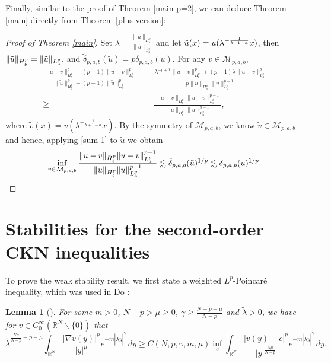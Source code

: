 \documentclass[11pt]{article}
\newtheorem{lemma}[theorem]{Lemma}
\newcommand{\R}{\mathbb{R}}
\numberwithin{equation}{section}
\begin{document}
Finally, similar to the proof of Theorem \ref{main p=2}, we can deduce Theorem \ref{main} directly from Theorem \ref{plus version}:
\begin{proof}[Proof of Theorem \ref{main}]
    Set $\lambda = \frac{\|u\|_{H^p_b}}{\|u\|_{L^p_a}}$ and let $\Tilde{u}(x) = u(\lambda^{-\frac{1}{b+1-a}} x)$, then $\|\Tilde{u}\|_{H^p_b} = \|\tilde{u}\|_{L^p_a}$, and $\tilde{\delta}_{p,a,b}(\tilde{u}) = p\delta_{p,a,b}(u)$. For any $v\in \mathcal{M}_{p,a,b}$,
    \begin{align*}
        \frac{\|\tilde{u}-v\|_{H_b^p}^p + (p-1)\|\tilde{u}-v\|_{L^p_a}^p}{\|\tilde{u}\|_{H^p_b}^p + (p-1)\|\tilde{u}\|_{L^p_a}^p} ={}& \frac{\lambda^{-p+1}\|u-\tilde{v}\|_{H^p_b}^p + (p-1)\lambda \|u-\tilde{v}\|_{L^p_a}^p}{p\|\tilde{u}\|_{H^p_b}\|\tilde{u}\|_{L^p_a}^{p-1}} \\
        \ge{}& \frac{\|u-\tilde{v}\|_{H^p_b}\|u-\tilde{v}\|_{L^p_a}^{p-1}}{\|u\|_{H_b^p}\|u\|_{L^p_a}^{p-1}},
    \end{align*}
    where $\tilde{v}(x) = v(\lambda^{-\frac{1}{b+1-a}}x)$. By the symmetry of $\mathcal{M}_{p,a,b}$, we know $\tilde{v}\in\mathcal{M}_{p,a,b}$ and hence, applying \eqref{sum 1} to $\tilde{u}$ we obtain
    \[ \inf_{v\in\mathcal{M}_{p,a,b}} \frac{\|u-v\|_{H^p_b}\|u-v\|_{L^p_a}^{p-1}}{\|u\|_{H^p_b}\|u\|_{L^p_a}^{p-1}} \lesssim \tilde{\delta}_{p,a,b}(\tilde{u})^{1/p} \lesssim \delta_{p,a,b}(u)^{1/p}. \qedhere\]
\end{proof}

\section{Stabilities for the second-order CKN inequalities}
To prove the weak stability result, we first state a weighted $L^p$-Poincar\'{e} inequality, which was used in Do \cite{Do2023}:
\begin{lemma}[{\cite[Corollary 4.1]{Do2023}}]\label{Lemma Poincare}
    For some $m>0$, $N-p>\mu \ge 0$, $\gamma \ge \frac{N-p-\mu}{N-p}$ and $\tilde{\lambda}>0$, we have for $v\in C_0^\infty(\R^N\backslash \{0\})$ that
    \[ \tilde{\lambda}^{\frac{N\mu}{N-p}-p-\mu} \int_{\R^N}\frac{|\nabla v(y)|^p}{|y|^\mu}e^{-m|\tilde{\lambda} y|^\gamma}\,dy \ge C(N,p,\gamma,m,\mu)\inf_c \int_{\R^N} \frac{|v(y)-c|^p}{|y|^{\frac{N\mu}{N-p}}}e^{-m|\tilde{\lambda} y|^\gamma}\,dy.\]
\end{lemma}
\end{document}
